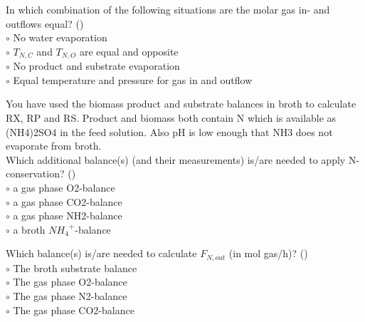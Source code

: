 \documentclass[]{beamer}
\begin{document}
\begin{frame}[shrink] {}
\addtocounter{questions}{1}
\color{blue}
In which combination of the following situations are the molar gas in- and outflows equal?  ()\\
\color{black}
\setlength{\parindent}{-0.4cm}
{\color{red}$\circ$}   No water evaporation\\
{\color{red}$\circ$} $T_{N,C}$ and $T_{N,O}$ are equal and opposite  \\
{\color{red}$\circ$} No product and substrate evaporation\\
{\color{red}$\circ$} Equal temperature and pressure for gas in and outflow    \\
\end{frame}

\begin{frame}[shrink] {}
\addtocounter{questions}{1}
\color{blue}
You have used the biomass product and substrate balances in broth to calculate RX, RP and RS. Product and biomass both contain N which is available as (NH4)2SO4 in the feed solution. Also pH is low enough that NH3 does not evaporate from broth.\\[0.3em]
Which additional balance(s) (and their measurements) is/are needed to apply N-conservation? ()\\
\color{black}
\setlength{\parindent}{-0.4cm}
{\color{red}$\circ$}   a gas phase O2-balance \\
{\color{red}$\circ$} a gas phase CO2-balance \\
{\color{red}$\circ$} a gas phase NH2-balance \\
{\color{red}$\circ$} a broth ${NH_4}^+$-balance  \\
\end{frame}

\begin{frame}[shrink] {}
\addtocounter{questions}{1}
\color{blue}
Which balance(s) is/are needed to calculate $F_{N,out}$ (in mol gas/h)?  ()\\
\color{black}
\setlength{\parindent}{-0.4cm}
{\color{red}$\circ$}    The broth substrate balance  \\
{\color{red}$\circ$} The gas phase O2-balance  \\
{\color{red}$\circ$} The gas phase N2-balance\\
{\color{red}$\circ$} The gas phase CO2-balance  \\
\end{frame}
\end{document}
